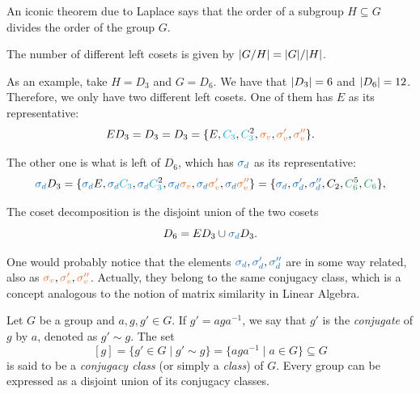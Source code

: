 An iconic theorem due to Laplace says that the order of a subgroup $H \subseteq G$ divides the order of the group $G$.

\begin{theorem}
The number of different left cosets is given by $\abs{G/H} = \abs{G} / \abs{H}$.
\end{theorem}

\begin{example} \label{ex:coset_decomp_D3D6}
As an example, take $H = D_3$ and $G = D_6$. We have that $\abs{D_3}=6$ and $\abs{D_6} = 12$. Therefore, we only have two different left cosets. One of them has $E$ as its representative:
\begin{equation} \label{eq:ED3-D6-first_coset}
E D_3 = D_3 = D_3 = \{E, \Ct, \Ctn{2}, \sv, \svp, \svpp\}.
\end{equation}

The other one is what is left of $D_6$, which has $\sd$ as its representative:
\begin{equation} \label{eq:sdD3-D6-second_coset}
\sd D_3 = \{\sd E, \sd \Ct, \sd \Ctn{2}, \sd \sv, \sd \svp, \sd \svpp\}
= \{ \sd, \sdp, \sdpp, C_2, \Csn{5}, \Cs \},
\end{equation}

The coset decomposition is the disjoint union of the two cosets
\begin{equation} \label{eq:D6_coset_decomp}
D_6 = ED_3 \cup \sd D_3.
\end{equation}
\end{example}

One would probably notice that the elements $\sd, \sdp, \sdpp$ are in some way related, also as $\sv, \svp, \svpp$. Actually, they belong to the same conjugacy class, which is a concept analogous to the notion of matrix similarity in Linear Algebra.

\begin{definition} \label{def:conj_class}
Let \(G\) be a group and \(a, g, g' \in G\). If \(g' = aga^{-1}\), we say that \(g'\) is the \textit{conjugate} of \(g\) by \(a\), denoted as \(g' \sim g\). The set
\begin{equation} \label{eq:defi_conjclass_[g]}
[g] = \{ g' \in G \mid g' \sim g \} = \{ a g a^{-1} \mid a \in G \} \subseteq G
\end{equation}
is said to be a \textit{conjugacy class} (or simply a \textit{class}) of \(G\). Every group can be expressed as a disjoint union of its conjugacy classes.
\end{definition}

